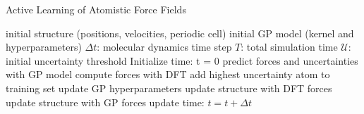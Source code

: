 \documentclass[%
reprint,
superscriptaddress,
amsmath,amssymb,
aps,
prl,
]{revtex4-1}
\begin{document}
\begin{algorithm}[H]
  \caption{Active Learning of Atomistic Force Fields}
  \label{EPSA}
   \begin{algorithmic}[1]
   \Require initial structure (positions, velocities, periodic cell)
   \Require initial GP model (kernel and hyperparameters)
   \Require $\Delta t$: molecular dynamics time step
   \Require $T$: total simulation time
   \Require $\mathcal{U}$: initial uncertainty threshold
   \State Initialize time: t = 0
   \State predict forces and uncertainties with GP model
   \State compute forces with DFT
   \State add highest uncertainty atom to training set
   \State update GP hyperparameters
   \State update structure with DFT forces
   \Else
   \State update structure with GP forces
   \EndIf
   \State update time: $t = t + \Delta t$
   \EndWhile
   \end{algorithmic}
\end{algorithm}









\end{document}
